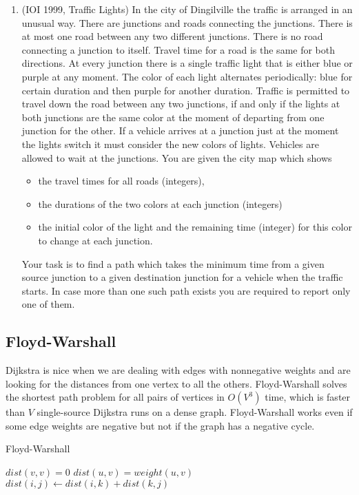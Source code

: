 \begin{enumerate}
\item
(IOI 1999, Traffic Lights)
In the city of Dingilville the traffic is arranged in an unusual way. There are junctions
and roads connecting the junctions. There is at most one road between any two different junctions. There is no
road connecting a junction to itself. Travel time for a road is the same for both directions. At every junction
there is a single traffic light that is either blue or purple at any moment. The color of each light alternates
periodically: blue for certain duration and then purple for another duration. Traffic is permitted to travel
down the road between any two junctions, if and only if the lights at both junctions are the same color at the
moment of departing from one junction for the other. If a vehicle arrives at a junction just at the moment the
lights switch it must consider the new colors of lights. Vehicles are allowed to wait at the junctions. You are
given the city map which shows
\begin{itemize}
\item
the travel times for all roads (integers),
\item
the durations of the two colors at each junction (integers)
\item
the initial color of the light and the remaining time (integer) for this color to change at each junction.
\end{itemize}
Your task is to find a path which takes the minimum time from a given source junction to a given destination
junction for a vehicle when the traffic starts. In case more than one such path exists you are required to report
only one of them.
\end{enumerate}

\subsection{Floyd-Warshall}

Dijkstra is nice when we are dealing with edges with nonnegative weights and are looking for the distances from one vertex to all the others. Floyd-Warshall solves the shortest path problem for all pairs of vertices in $O(V^3)$ time, which is faster than $V$ single-source Dijkstra runs on a dense graph. Floyd-Warshall works even if some edge weights are negative but not if the graph has a negative cycle.

\begin{algorithm}[H]
\caption{Floyd-Warshall}
\begin{algorithmic}
	\State $dist(v,v)=0$
\EndFor
{}
	\State $dist(u,v)=weight(u,v)$
\EndFor
{}
            	\State $dist(i,j) \gets dist(i,k)+dist(k,j)$
            \EndIf
        \EndFor
    \EndFor
\EndFor
\end{algorithmic}
\end{algorithm}

